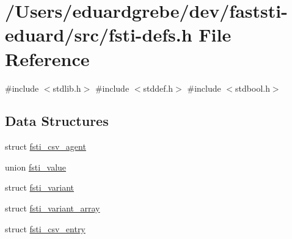 \hypertarget{fsti-defs_8h}{}\section{/\+Users/eduardgrebe/dev/faststi-\/eduard/src/fsti-\/defs.h File Reference}
\label{fsti-defs_8h}
{\ttfamily \#include $<$stdlib.\+h$>$}\newline
{\ttfamily \#include $<$stddef.\+h$>$}\newline
{\ttfamily \#include $<$stdbool.\+h$>$}\newline
\subsection*{Data Structures}
\begin{DoxyCompactItemize}
\item 
struct \mbox{\hyperlink{structfsti__csv__agent}{fsti\+\_\+csv\+\_\+agent}}
\item 
union \mbox{\hyperlink{unionfsti__value}{fsti\+\_\+value}}
\item 
struct \mbox{\hyperlink{structfsti__variant}{fsti\+\_\+variant}}
\item 
struct \mbox{\hyperlink{structfsti__variant__array}{fsti\+\_\+variant\+\_\+array}}
\item 
struct \mbox{\hyperlink{structfsti__csv__entry}{fsti\+\_\+csv\+\_\+entry}}
\end{DoxyCompactItemize}
